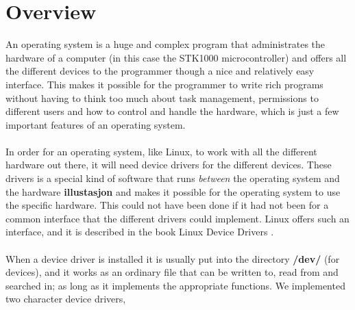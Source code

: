 \section{Overview}
An operating system is a huge and complex program that 
administrates the hardware of a computer (in this case the
STK1000 microcontroller) and offers all the different devices
to the programmer though a nice and relatively easy interface.
This makes it possible for the programmer to write rich
programs without having to think too much about task management,
permissions to different users and how to control and handle
the hardware, which is just a few important features of an
operating system.\\
\\
In order for an operating system, like Linux, 
to work with all the different hardware out there, it will need
device drivers for the different devices. These drivers is a 
special kind of software that runs \textit{between} the operating
system and the hardware \textbf{illustasjon} and makes it possible
for the operating system to use the specific hardware. This could
not have been done if it had not been for a common interface that 
the different drivers could implement. Linux offers such an 
interface, and it is described in the book 
Linux Device Drivers \cite{linux-device-drivers}.\\
\\
When a device driver is installed it is usually put into the directory
\textbf{/dev/} (for devices), and it works as an ordinary file
that can be written to, read from and searched in; as long as it 
implements the appropriate functions. We implemented two character
device\cite{character-device} drivers, 